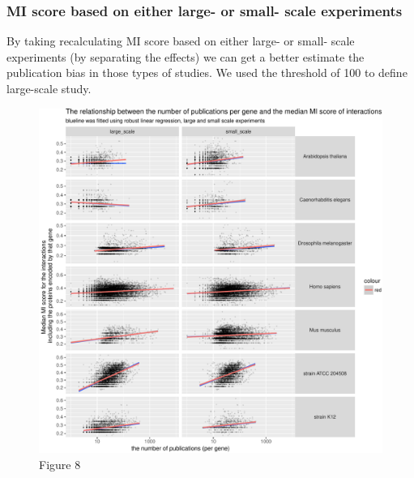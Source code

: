 \documentclass[]{article}
\begin{document}
\subsubsection{MI score based on either large- or small- scale
experiments}\label{mi-score-based-on-either-large--or-small--scale-experiments}

By taking recalculating MI score based on either large- or small- scale
experiments (by separating the effects) we can get a better estimate the
publication bias in those types of studies. We used the threshold of 100
to define large-scale study.

\begin{figure}[htbp]
\centering
\includegraphics{final_report_files/figure-latex/N_publications_vs_recalculated_MI_score_median-1.pdf}
\caption{Figure 8}
\end{figure}
\end{document}
